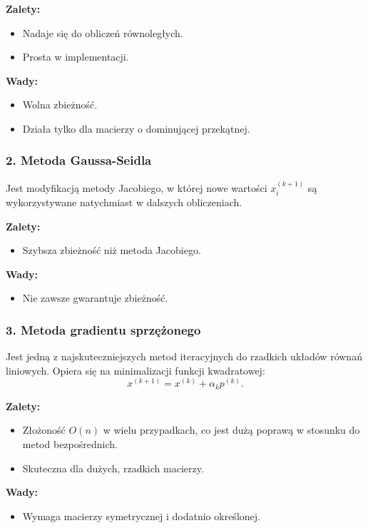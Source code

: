 \textbf{Zalety:}
\begin{itemize}
    \item Nadaje się do obliczeń równoległych.
    \item Prosta w implementacji.
\end{itemize}

\textbf{Wady:}
\begin{itemize}
    \item Wolna zbieżność.
    \item Działa tylko dla macierzy o dominującej przekątnej.
\end{itemize}

\subsubsection{2. Metoda Gaussa-Seidla}
Jest modyfikacją metody Jacobiego, w której nowe wartości \( x_i^{(k+1)} \) są wykorzystywane natychmiast w dalszych obliczeniach.

\textbf{Zalety:}
\begin{itemize}
    \item Szybsza zbieżność niż metoda Jacobiego.
\end{itemize}

\textbf{Wady:}
\begin{itemize}
    \item Nie zawsze gwarantuje zbieżność.
\end{itemize}

\subsubsection{3. Metoda gradientu sprzężonego}
Jest jedną z najskuteczniejszych metod iteracyjnych do rzadkich układów równań liniowych. Opiera się na minimalizacji funkcji kwadratowej:
\[
x^{(k+1)} = x^{(k)} + \alpha_k p^{(k)}.
\]

\textbf{Zalety:}
\begin{itemize}
    \item Złożoność \( O(n) \) w wielu przypadkach, co jest dużą poprawą w stosunku do metod bezpośrednich.
    \item Skuteczna dla dużych, rzadkich macierzy.
\end{itemize}

\textbf{Wady:}
\begin{itemize}
    \item Wymaga macierzy symetrycznej i dodatnio określonej.
\end{itemize}

